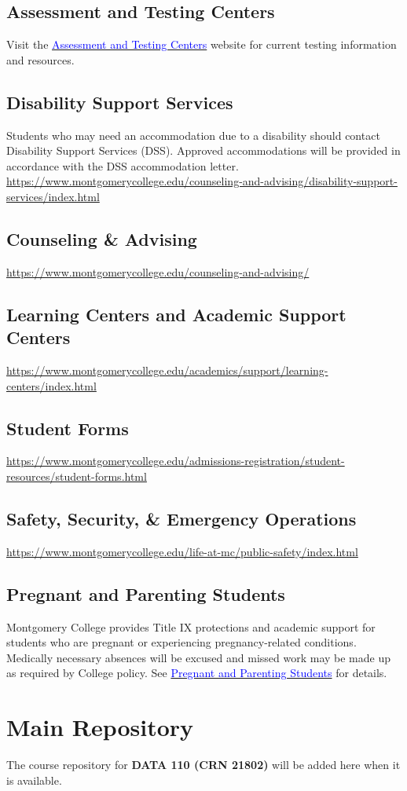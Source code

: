 \documentclass{exam}
\begin{document}
\subsection*{Assessment and Testing Centers}
Visit the \href{https://www.montgomerycollege.edu/admissions-registration/assessment-testing-centers/}{\textcolor{blue}{Assessment and Testing Centers}} website for current testing information and resources.

\subsection*{Disability Support Services}
Students who may need an accommodation due to a disability should contact Disability Support Services (DSS). Approved accommodations will be provided in accordance with the DSS accommodation letter.
\url{https://www.montgomerycollege.edu/counseling-and-advising/disability-support-services/index.html}

\subsection*{Counseling \& Advising}
\url{https://www.montgomerycollege.edu/counseling-and-advising/}

\subsection*{Learning Centers and Academic Support Centers}
\url{https://www.montgomerycollege.edu/academics/support/learning-centers/index.html}

\subsection*{Student Forms}
\url{https://www.montgomerycollege.edu/admissions-registration/student-resources/student-forms.html}

\subsection*{Safety, Security, \& Emergency Operations}
\url{https://www.montgomerycollege.edu/life-at-mc/public-safety/index.html}

\subsection*{Pregnant and Parenting Students}
Montgomery College provides Title IX protections and academic support for students who are pregnant or experiencing pregnancy-related conditions. Medically necessary absences will be excused and missed work may be made up as required by College policy. See \href{https://www.montgomerycollege.edu/policies-and-procedures/title-ix/pregnant-parenting-students.html}{\textcolor{blue}{Pregnant and Parenting Students}} for details.

\section*{Main Repository}
The course repository for \textbf{DATA 110 (CRN 21802)} will be added here when it is available.
\end{document}
